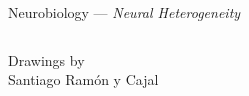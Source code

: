 \documentclass[aspectratio=169]{beamer}
\renewcommand{\emph}[1]{{\color{violet}\textit{#1}}}
\begin{document}
\begin{frame}{Neurobiology --- \emph{Neural Heterogeneity}}
\begin{columns}
			\vspace{-0.75cm}\begin{minipage}{6cm}{\raggedleft\footnotesize Drawings by\\Santiago Ramón y Cajal\\}\end{minipage}
	\end{columns}
\end{frame}


%    

\end{document}
